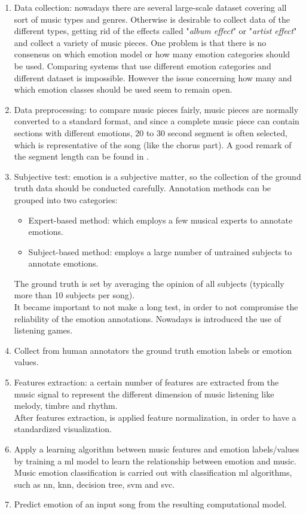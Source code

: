 \begin{enumerate}
	\item Data collection: nowadays there are several large-scale dataset covering all sort of music types and genres. Otherwise is desirable to collect data of the different types, getting rid of the effects called "\textit{album effect}" or "\textit{artist effect}" and collect a variety of music pieces. One problem is that there is no consensus on which emotion model or how many emotion categories should be used. Comparing systems that use different emotion categories  and different dataset is impossible. However the issue concerning how many and which emotion classes should be used seem to remain open.
	\item Data preprocessing: to compare music pieces fairly, music pieces are normally converted to a standard format, and since a complete music piece can contain sections with different emotions, $20$ to $30$ second segment is often selected, which is representative of the song (like the chorus part). A good remark of the segment length can be found in \cite{macdorman2007automatic}.
	\item Subjective test: emotion is a subjective matter, so the collection of the ground truth data should be conducted carefully. Annotation methods can be grouped into two categories:
	\begin{itemize}
		\item Expert-based method: which employs a few musical experts to annotate emotions.
		\item Subject-based method: employs a large number of untrained subjects to annotate emotions.
	\end{itemize}
	The ground truth is set by averaging the opinion of all subjects (typically more than 10 subjects per song).
	\\
	It became important to not make a long test, in order to not compromise the reliability of the emotion annotations. Nowadays is introduced the use of listening games.
	\item Collect from human annotators the ground truth emotion labels or emotion values.
	\item Features extraction: a certain number of features are extracted from the music signal to represent the different dimension of music listening like melody, timbre and rhythm.
	\\
	After features extraction, is applied feature normalization, in order to have a standardized visualization.
	\item Apply a learning algorithm between music features and emotion labels/values by training a \gls{ml} model to learn the relationship between emotion and music. Music emotion classification is carried out with classification \gls{ml} algorithms, such as \gls{nn}, \gls{knn}, decision tree, \gls{svm} and \gls{svc}.
	\item Predict emotion of an input song from the resulting computational model.
\end{enumerate}
